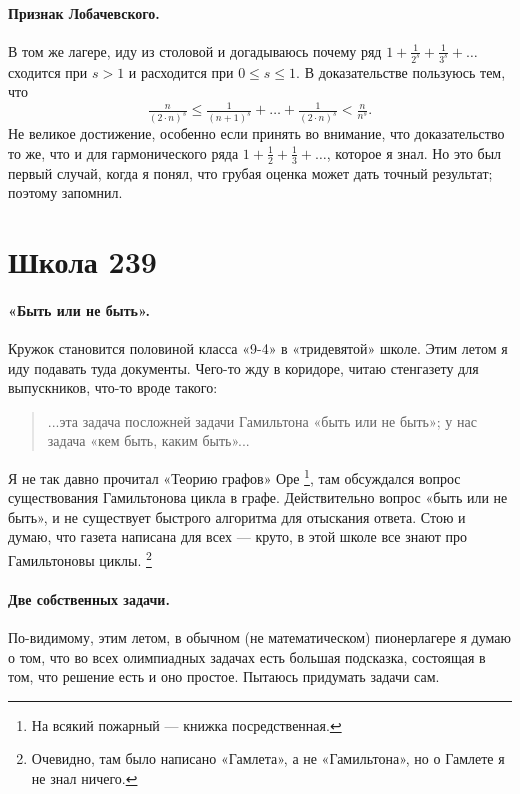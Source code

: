 \documentclass{book}
\begin{document}
\paragraph{Признак Лобачевского.}
В том же лагере, иду из столовой и догадываюсь почему ряд $1+\tfrac{1}{2^s}+\tfrac{1}{3^s}+\dots$ сходится при $s> 1$ 
и расходится при $0\le s\le 1$.
В доказательстве пользуюсь тем, что 
$$\tfrac n{(2{\cdot}n)^s}
\le \tfrac1{(n+1)^s}+\dots+\tfrac1{(2{\cdot}n)^s}
<\tfrac n{n^{s}}.$$
Не великое достижение, особенно если принять во внимание, что доказательство то же, что и для гармонического ряда  $1+\tfrac{1}{2}+\tfrac{1}{3}+\dots$, которое я знал.
Но это был первый случай, когда я понял, что грубая оценка может дать точный результат;
поэтому запомнил.


\section*{Школа 239}



\paragraph{«Быть или не быть».}
Кружок становится половиной класса «9-4» 
в «тридевятой» школе.
Этим летом я иду подавать туда документы.
Чего-то жду в коридоре, читаю стенгазету для выпускников, что-то вроде такого:
\begin{verse}
...эта задача посложней задачи Гамильтона «быть или не быть»;
у нас задача «кем быть, каким быть»...
\end{verse}
Я не так давно прочитал  «Теорию графов» Оре%
\footnote{На всякий пожарный --- книжка посредственная.},
там обсуждался вопрос существования Гамильтонова цикла в графе.
Действительно вопрос «быть или не быть»,
и не существует быстрого алгоритма для отыскания ответа.
Стою и думаю, что газета написана для всех --- круто, в этой школе все знают про Гамильтоновы циклы.%
\footnote{Очевидно, там было написано «Гамлета», а не «Гамильтона», но о Гамлете я не знал ничего.}

\paragraph{Две собственных задачи.}
По-видимому, этим летом, в обычном (не математическом)
пионерлагере я думаю о том, что во всех олимпиадных задачах
есть большая подсказка, состоящая в том, что решение есть и оно простое.
Пытаюсь придумать задачи сам.
\end{document}
